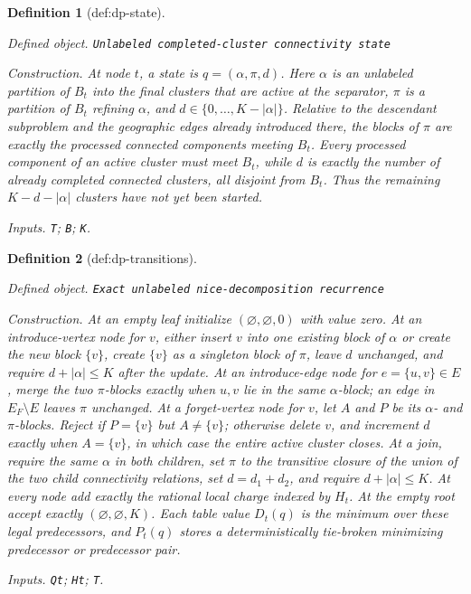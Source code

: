 \documentclass{article}
\newtheorem{definition}{Definition}
\begin{document}
\begin{definition}[def:dp-state]\label{def:dp-state}
\par\smallskip\noindent\emph{Defined object.} \texttt{Unlabeled completed-\allowbreak{}cluster connectivity state}
\par\smallskip\noindent\emph{Construction.} At node \(t\), a state is \(q=(\alpha,\pi,d)\).  Here \(\alpha\) is an unlabeled partition of \(B_t\) into the final clusters that are active at the separator, \(\pi\) is a partition of \(B_t\) refining \(\alpha\), and \(d\in\{0,\ldots,K-|\alpha|\}\).  Relative to the descendant subproblem and the geographic edges already introduced there, the blocks of \(\pi\) are exactly the processed connected components meeting \(B_t\).  Every processed component of an active cluster must meet \(B_t\), while \(d\) is exactly the number of already completed connected clusters, all disjoint from \(B_t\).  Thus the remaining \(K-d-|\alpha|\) clusters have not yet been started.
\par\smallskip\noindent\emph{Inputs.} \texttt{T}; \texttt{B}; \texttt{K}.
\end{definition}

\begin{definition}[def:dp-transitions]\label{def:dp-transitions}
\par\smallskip\noindent\emph{Defined object.} \texttt{Exact unlabeled nice-\allowbreak{}decomposition recurrence}
\par\smallskip\noindent\emph{Construction.} At an empty leaf initialize \((\varnothing,\varnothing,0)\) with value zero.  At an introduce-vertex node for \(v\), either insert \(v\) into one existing block of \(\alpha\) or create the new block \(\{v\}\), create \(\{v\}\) as a singleton block of \(\pi\), leave \(d\) unchanged, and require \(d+|\alpha|\le K\) after the update.  At an introduce-edge node for \(e=\{u,v\}\in E\), merge the two \(\pi\)-blocks exactly when \(u,v\) lie in the same \(\alpha\)-block; an edge in \(E_F\setminus E\) leaves \(\pi\) unchanged.  At a forget-vertex node for \(v\), let \(A\) and \(P\) be its \(\alpha\)- and \(\pi\)-blocks.  Reject if \(P=\{v\}\) but \(A\ne\{v\}\); otherwise delete \(v\), and increment \(d\) exactly when \(A=\{v\}\), in which case the entire active cluster closes.  At a join, require the same \(\alpha\) in both children, set \(\pi\) to the transitive closure of the union of the two child connectivity relations, set \(d=d_1+d_2\), and require \(d+|\alpha|\le K\).  At every node add exactly the rational local charge indexed by \(H_t\).  At the empty root accept exactly \((\varnothing,\varnothing,K)\).  Each table value \(D_t(q)\) is the minimum over these legal predecessors, and \(P_t(q)\) stores a deterministically tie-broken minimizing predecessor or predecessor pair.
\par\smallskip\noindent\emph{Inputs.} \texttt{Qt}; \texttt{Ht}; \texttt{T}.
\end{definition}
\end{document}
